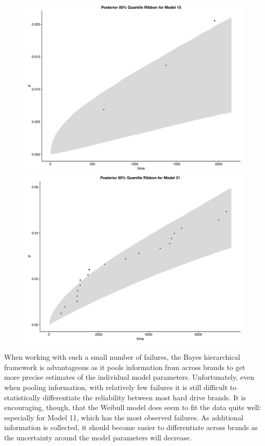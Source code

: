 \documentclass{scrartcl}
\begin{document}
\begin{figure}[H]
  \centering
  \begin{minipage}[b]{0.4\textwidth}
    \includegraphics[width=\textwidth]{plot3.pdf}
  \end{minipage}
  \hfill
  \begin{minipage}[b]{0.4\textwidth}
    \includegraphics[width=\textwidth]{plot4.pdf}
  \end{minipage}
\end{figure}

When working with such a small number of failures, the Bayes hierarchical framework is advantageous as it pools information from across brands to get more precise estimates of the individual model parameters.  Unfortunately, even when pooling information, with relatively few failures it is still difficult to statistically differentiate the reliability between most hard drive brands. It is encouraging, though, that the Weibull model does seem to fit the data quite well: especially for Model 11, which has the most observed failures.  As additional information is collected, it should become easier to differentiate across brands as the uncertainty around the model parameters will decrease.\\ 
\end{document}
